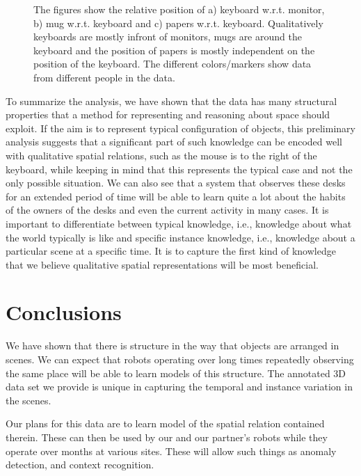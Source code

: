 \documentclass[letterpaper, 10 pt, conference]{ieeeconf}  %
\begin{document}
\begin{figure}
\begin{center}
\end{center}
\caption{The figures show the relative position of a) keyboard w.r.t. monitor, b) mug w.r.t. keyboard and c) papers w.r.t. keyboard. Qualitatively keyboards are mostly infront of monitors, mugs are around the keyboard and the position of papers is mostly independent on the position of the keyboard. The different colors/markers show data from different people in the data.} 
\label{fig:scatter-rest}
\end{figure}

To summarize the analysis, we have shown that the data has many structural properties that a method for representing and reasoning about 
space should exploit. If the aim is to represent typical configuration of objects, this preliminary analysis suggests that a significant 
part of such knowledge can be encoded well with qualitative spatial relations, such as the mouse is to the right of the keyboard, while 
keeping in mind that this represents the typical case and not the only possible situation. We can also see that a system that observes these desks for 
an extended period of time will be able to learn quite a lot about the habits of the owners of the desks and even the current activity in 
many cases. It is important to differentiate between typical knowledge, i.e., knowledge about what the world typically is like and specific 
instance knowledge, i.e., knowledge about a particular scene at a specific time. It is to capture the first kind of knowledge that we 
believe  qualitative spatial representations will be most beneficial. 

\section{Conclusions}
\label{sec:Conclusions}

We have shown that there is structure in the way that objects are
arranged in scenes.  We can expect that robots operating over long
times repeatedly observing the same place will be able to learn models
of this structure.  The annotated 3D data set we provide is unique in
capturing the temporal and instance variation in the scenes.

Our plans for this data are to learn model of the spatial relation
contained therein.  These can then be used by our and our partner's
robots while they operate over months at various sites.  These will
allow such things as anomaly detection, and context recognition.
\end{document}

